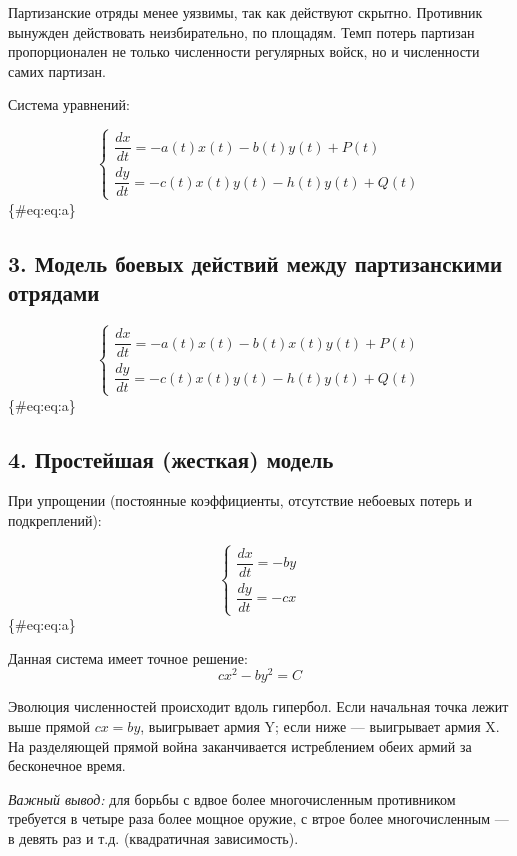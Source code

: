 \documentclass[
  12pt,
  a4paper,
  DIV=11,
  numbers=noendperiod]{scrreprt}
\begin{document}
Партизанские отряды менее уязвимы, так как действуют скрытно. Противник
вынужден действовать неизбирательно, по площадям. Темп потерь партизан
пропорционален не только численности регулярных войск, но и численности
самих партизан.

Система уравнений:

\[
\begin{cases}
\dfrac{dx}{dt} = -a(t)x(t) - b(t)y(t) + P(t) \\
\dfrac{dy}{dt} = -c(t)x(t)y(t) - h(t)y(t) + Q(t)
\end{cases}
\]\{\#eq:eq:a\}

\subsection{3. Модель боевых действий между партизанскими
отрядами}\label{ux43cux43eux434ux435ux43bux44c-ux431ux43eux435ux432ux44bux445-ux434ux435ux439ux441ux442ux432ux438ux439-ux43cux435ux436ux434ux443-ux43fux430ux440ux442ux438ux437ux430ux43dux441ux43aux438ux43cux438-ux43eux442ux440ux44fux434ux430ux43cux438}

\[
\begin{cases}
\dfrac{dx}{dt} = -a(t)x(t) - b(t)x(t)y(t) + P(t) \\
\dfrac{dy}{dt} = -c(t)x(t)y(t) - h(t)y(t) + Q(t)
\end{cases}
\]\{\#eq:eq:a\}

\subsection{4. Простейшая (жесткая)
модель}\label{ux43fux440ux43eux441ux442ux435ux439ux448ux430ux44f-ux436ux435ux441ux442ux43aux430ux44f-ux43cux43eux434ux435ux43bux44c}

При упрощении (постоянные коэффициенты, отсутствие небоевых потерь и
подкреплений):

\[
\begin{cases}
\dfrac{dx}{dt} = - by\\
\dfrac{dy}{dt} = -cx
\end{cases}
\]\{\#eq:eq:a\}

Данная система имеет точное решение: \[
cx^2 - by^2 = C
\]

Эволюция численностей происходит вдоль гипербол. Если начальная точка
лежит выше прямой \(cx = by\), выигрывает армия Y; если ниже ---
выигрывает армия X. На разделяющей прямой война заканчивается
истреблением обеих армий за бесконечное время.

\emph{Важный вывод:} для борьбы с вдвое более многочисленным противником
требуется в четыре раза более мощное оружие, с втрое более
многочисленным --- в девять раз и т.д. (квадратичная зависимость).
\end{document}
